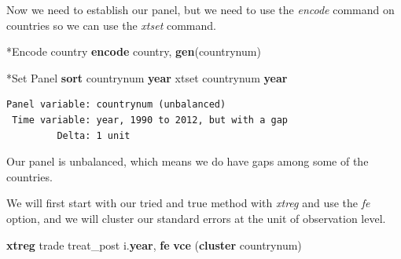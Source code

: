 \documentclass[
]{book}
\newenvironment{Shaded}{\begin{snugshade}}{\end{snugshade}}
\newcommand{\FunctionTok}[1]{\textcolor[rgb]{0.13,0.29,0.53}{\textbf{#1}}}
\newcommand{\KeywordTok}[1]{\textcolor[rgb]{0.13,0.29,0.53}{\textbf{#1}}}
\newcommand{\NormalTok}[1]{#1}
\begin{document}
Now we need to establish our panel, but we need to use the \emph{encode} command on countries so we can use the \emph{xtset} command.

\begin{Shaded}
\begin{Highlighting}[]
\NormalTok{*Encode country}
\KeywordTok{encode}\NormalTok{ country, }\KeywordTok{gen}\NormalTok{(countrynum)}

\NormalTok{*Set Panel}
\KeywordTok{sort}\NormalTok{ countrynum }\FunctionTok{year}
\NormalTok{xtset countrynum }\FunctionTok{year}
\end{Highlighting}
\end{Shaded}

\begin{verbatim}
Panel variable: countrynum (unbalanced)
 Time variable: year, 1990 to 2012, but with a gap
         Delta: 1 unit
\end{verbatim}

Our panel is unbalanced, which means we do have gaps among some of the countries.

We will first start with our tried and true method with \emph{xtreg} and use the \emph{fe} option, and we will cluster our standard errors at the unit of observation level.

\begin{Shaded}
\begin{Highlighting}[]
\KeywordTok{xtreg}\NormalTok{ trade treat\_post i.}\FunctionTok{year}\NormalTok{, }\KeywordTok{fe} \KeywordTok{vce}\NormalTok{ (}\KeywordTok{cluster}\NormalTok{ countrynum)}
\end{Highlighting}
\end{Shaded}
\end{document}
